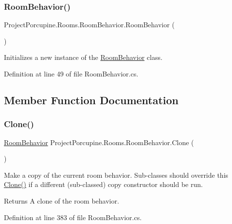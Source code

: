 \subsubsection{\texorpdfstring{Room\+Behavior()}{RoomBehavior()}}
{\footnotesize\ttfamily Project\+Porcupine.\+Rooms.\+Room\+Behavior.\+Room\+Behavior (\begin{DoxyParamCaption}{ }\end{DoxyParamCaption})}



Initializes a new instance of the \hyperlink{class_project_porcupine_1_1_rooms_1_1_room_behavior}{Room\+Behavior} class. 



Definition at line 49 of file Room\+Behavior.\+cs.



\subsection{Member Function Documentation}
\mbox{\label{class_project_porcupine_1_1_rooms_1_1_room_behavior_a474e120ab2239b9ede3fe4ededf9f818}} 
\subsubsection{\texorpdfstring{Clone()}{Clone()}}
{\footnotesize\ttfamily \hyperlink{class_project_porcupine_1_1_rooms_1_1_room_behavior}{Room\+Behavior} Project\+Porcupine.\+Rooms.\+Room\+Behavior.\+Clone (\begin{DoxyParamCaption}{ }\end{DoxyParamCaption})}



Make a copy of the current room behavior. Sub-\/classes should override this \hyperlink{class_project_porcupine_1_1_rooms_1_1_room_behavior_a474e120ab2239b9ede3fe4ededf9f818}{Clone()} if a different (sub-\/classed) copy constructor should be run. 

\begin{DoxyReturn}{Returns}
A clone of the room behavior.
\end{DoxyReturn}


Definition at line 383 of file Room\+Behavior.\+cs.

